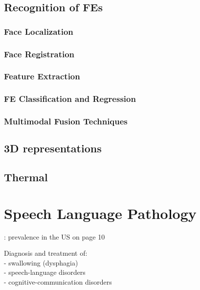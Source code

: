 \subsection{Recognition of FEs}

\subsubsection{Face Localization}

\subsubsection{Face Registration}

\subsubsection{Feature Extraction}

\subsubsection{FE Classification and Regression}

\subsubsection{Multimodal Fusion Techniques}

\subsection{3D representations}
\cite{Sandbach2012survey}
\subsection{Thermal}


\section{Speech Language Pathology}
\label{sec:SLP}
\cite{SLPathologies}: prevalence in the US on page 10

Diagnosis and treatment of:\\
- swallowing (dysphagia) \\
- speech-language disorders\\
- cognitive-communication disorders\\


